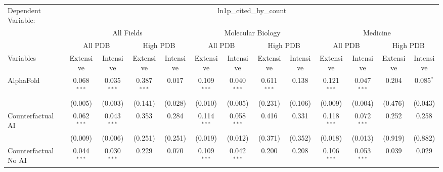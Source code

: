 \begingroup
\centering
\begin{tabular}{lcccccccccccc}
   \tabularnewline \midrule \midrule
   Dependent Variable: & \multicolumn{12}{c}{ln1p\_cited\_by\_count}\\
 & \multicolumn{4}{c}{All Fields} & \multicolumn{4}{c}{Molecular Biology} & \multicolumn{4}{c}{Medicine} \\
\cmidrule(lr){2-5} \cmidrule(lr){6-9} \cmidrule(lr){10-13}
 & \multicolumn{2}{c}{All PDB} & \multicolumn{2}{c}{High PDB} & \multicolumn{2}{c}{All PDB} & \multicolumn{2}{c}{High PDB} & \multicolumn{2}{c}{All PDB} & \multicolumn{2}{c}{High PDB} \\
\cmidrule(lr){2-3} \cmidrule(lr){4-5} \cmidrule(lr){6-7} \cmidrule(lr){8-9} \cmidrule(lr){10-11} \cmidrule(lr){12-13}
Variables & \multicolumn{1}{c}{Extensive} & \multicolumn{1}{c}{Intensive} & \multicolumn{1}{c}{Extensive} & \multicolumn{1}{c}{Intensive} & \multicolumn{1}{c}{Extensive} & \multicolumn{1}{c}{Intensive} & \multicolumn{1}{c}{Extensive} & \multicolumn{1}{c}{Intensive} & \multicolumn{1}{c}{Extensive} & \multicolumn{1}{c}{Intensive} & \multicolumn{1}{c}{Extensive} & \multicolumn{1}{c}{Intensive} \\
\cmidrule(lr){1-1}\cmidrule(lr){2-2} \cmidrule(lr){3-3} \cmidrule(lr){4-4} \cmidrule(lr){5-5} \cmidrule(lr){6-6} \cmidrule(lr){7-7} \cmidrule(lr){8-8} \cmidrule(lr){9-9} \cmidrule(lr){10-10} \cmidrule(lr){11-11} \cmidrule(lr){12-12} \cmidrule(lr){13-13}
   AlphaFold                                & 0.068$^{***}$ & 0.035$^{***}$ & 0.387$^{***}$ & 0.017   & 0.109$^{***}$ & 0.040$^{***}$  & 0.611$^{***}$ & 0.138   & 0.121$^{***}$ & 0.047$^{***}$  & 0.204   & 0.085$^{*}$\\   
                                            & (0.005)       & (0.003)       & (0.141)       & (0.028) & (0.010)       & (0.005)        & (0.231)       & (0.106) & (0.009)       & (0.004)        & (0.476) & (0.043)\\   
   Counterfactual AI                        & 0.062$^{***}$ & 0.043$^{***}$ & 0.353         & 0.284   & 0.114$^{***}$ & 0.058$^{***}$  & 0.416         & 0.331   & 0.118$^{***}$ & 0.072$^{***}$  & 0.252   & 0.258\\   
                                            & (0.009)       & (0.006)       & (0.251)       & (0.251) & (0.019)       & (0.012)        & (0.371)       & (0.352) & (0.018)       & (0.013)        & (0.919) & (0.882)\\   
   Counterfactual No AI                     & 0.044$^{***}$ & 0.030$^{***}$ & 0.229         & 0.070   & 0.109$^{***}$ & 0.042$^{***}$  & 0.200         & 0.208   & 0.106$^{***}$ & 0.053$^{***}$  & 0.039   & 0.029\\   

\end{tabular}
